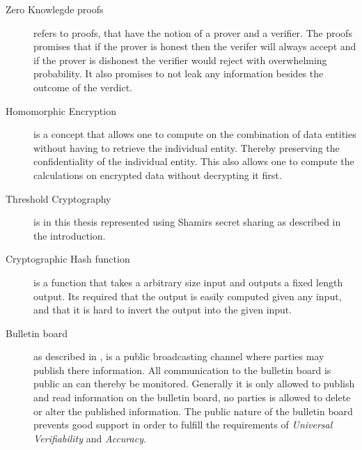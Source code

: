 \begin{description}
    \item[Zero Knowlegde proofs] refers to proofs, that have the notion of a prover and a verifier. The proofs promises that if the prover is honest then the verifer will always accept and if the prover is dishonest the verifier would reject with overwhelming probability. It also promises to not leak any information besides the outcome of the verdict. 
    
    \item[Homomorphic Encryption] is a concept that allows one to compute on the combination of data entities without having to retrieve the individual entity. Thereby preserving the confidentiality of the individual entity. This also allows one to compute the calculations on encrypted data without decrypting it first. 
    
    \item[Threshold Cryptography] is in this thesis represented using Shamirs secret sharing as described in the introduction. 
        
    \item[Cryptographic Hash function] is a function that takes a arbitrary size input and outputs a fixed length output. Its required that the output is easily computed given any input, and that it is hard to invert the output into the given input. 
    
    \item[Bulletin board] as described in \cite{Cet09}, is a public broadcasting channel where parties may publish there information. All communication to the bulletin board is public an can thereby be monitored. Generally it is only allowed to publish and read information on the bulletin board, no parties is allowed to delete or alter the published information. The public nature of the bulletin board prevents good support in order to fulfill the requirements of \textit{Universal Verifiability} and \textit{Accuracy}. 
\end{description}



